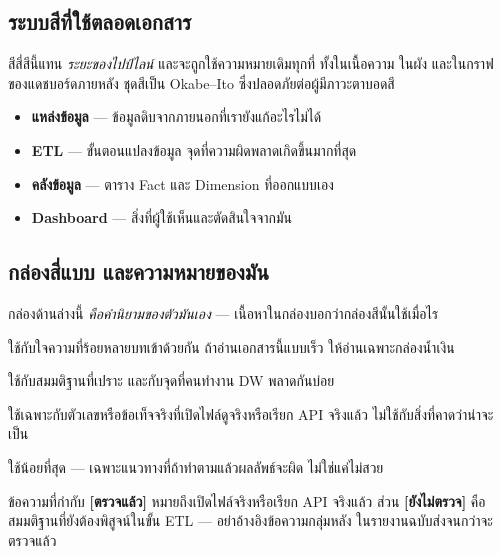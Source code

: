 \documentclass[11pt,a4paper]{article}
\newcommand{\en}[1]{#1}
\newcommand{\stg}[2]{\textcolor{#1}{\textbf{\en{#2}}}}
\newcommand{\ssrc}{\stg{src}{แหล่งข้อมูล}}
\newcommand{\setl}{\stg{etl}{ETL}}
\newcommand{\sdw}{\stg{dw}{คลังข้อมูล}}
\newcommand{\sdash}{\stg{dash}{Dashboard}}
\newcommand{\ok}{\textcolor{dw}{\textbf{[ตรวจแล้ว]}}}
\newcommand{\tbc}{\textcolor{etl}{\textbf{[ยังไม่ตรวจ]}}}
\begin{document}
\subsection*{ระบบสีที่ใช้ตลอดเอกสาร}
สีสี่สีนี้แทน \emph{ระยะของไปป์ไลน์} และจะถูกใช้ความหมายเดิมทุกที่ ทั้งในเนื้อความ
ในผัง และในกราฟของแดชบอร์ดภายหลัง ชุดสีเป็น Okabe--Ito ซึ่งปลอดภัยต่อผู้มีภาวะตาบอดสี

\begin{itemize}
\item \ssrc{} — ข้อมูลดิบจากภายนอกที่เรายังแก้อะไรไม่ได้
\item \setl{} — ขั้นตอนแปลงข้อมูล จุดที่ความผิดพลาดเกิดขึ้นมากที่สุด
\item \sdw{} — ตาราง Fact และ Dimension ที่ออกแบบเอง
\item \sdash{} — สิ่งที่ผู้ใช้เห็นและตัดสินใจจากมัน
\end{itemize}

\subsection*{กล่องสี่แบบ และความหมายของมัน}
กล่องด้านล่างนี้ \emph{คือคำนิยามของตัวมันเอง} --- เนื้อหาในกล่องบอกว่ากล่องสีนั้นใช้เมื่อไร

\begin{keybox}[title={กล่องน้ำเงิน: ข้อสรุปที่ต้องจำ}]
ใช้กับใจความที่ร้อยหลายบทเข้าด้วยกัน ถ้าอ่านเอกสารนี้แบบเร็ว ให้อ่านเฉพาะกล่องน้ำเงิน
\end{keybox}

\begin{warnbox}[title={กล่องส้ม: กับดัก หรือข้อแม้ที่ถ้าลืมแล้วข้อสรุปจะผิด}]
ใช้กับสมมติฐานที่เปราะ และกับจุดที่คนทำงาน DW พลาดกันบ่อย
\end{warnbox}

\begin{goodbox}[title={กล่องเขียว: สิ่งที่ตรวจสอบกับข้อมูลจริงแล้ว}]
ใช้เฉพาะกับตัวเลขหรือข้อเท็จจริงที่เปิดไฟล์ดูจริงหรือเรียก API จริงแล้ว
ไม่ใช้กับสิ่งที่คาดว่าน่าจะเป็น
\end{goodbox}

\begin{badbox}[title={กล่องแดง: วิธีที่ผิดจริง ๆ}]
ใช้น้อยที่สุด --- เฉพาะแนวทางที่ถ้าทำตามแล้วผลลัพธ์จะผิด ไม่ใช่แค่ไม่สวย
\end{badbox}

\begin{warnbox}[title={สถานะของข้อมูลในเอกสารนี้}]
ข้อความที่กำกับ \ok{} หมายถึงเปิดไฟล์จริงหรือเรียก API จริงแล้ว
ส่วน \tbc{} คือสมมติฐานที่ยังต้องพิสูจน์ในขั้น ETL --- อย่าอ้างอิงข้อความกลุ่มหลัง
ในรายงานฉบับส่งจนกว่าจะตรวจแล้ว
\end{warnbox}
\end{document}
